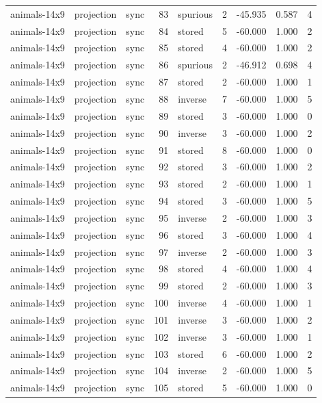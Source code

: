 \begin{tabular}{lllrlrrrr}
animals-14x9 & projection & sync & 83 & spurious & 2 & -45.935 & 0.587 & 4 \\
animals-14x9 & projection & sync & 84 & stored & 5 & -60.000 & 1.000 & 2 \\
animals-14x9 & projection & sync & 85 & stored & 4 & -60.000 & 1.000 & 2 \\
animals-14x9 & projection & sync & 86 & spurious & 2 & -46.912 & 0.698 & 4 \\
animals-14x9 & projection & sync & 87 & stored & 2 & -60.000 & 1.000 & 1 \\
animals-14x9 & projection & sync & 88 & inverse & 7 & -60.000 & 1.000 & 5 \\
animals-14x9 & projection & sync & 89 & stored & 3 & -60.000 & 1.000 & 0 \\
animals-14x9 & projection & sync & 90 & inverse & 3 & -60.000 & 1.000 & 2 \\
animals-14x9 & projection & sync & 91 & stored & 8 & -60.000 & 1.000 & 0 \\
animals-14x9 & projection & sync & 92 & stored & 3 & -60.000 & 1.000 & 2 \\
animals-14x9 & projection & sync & 93 & stored & 2 & -60.000 & 1.000 & 1 \\
animals-14x9 & projection & sync & 94 & stored & 3 & -60.000 & 1.000 & 5 \\
animals-14x9 & projection & sync & 95 & inverse & 2 & -60.000 & 1.000 & 3 \\
animals-14x9 & projection & sync & 96 & stored & 3 & -60.000 & 1.000 & 4 \\
animals-14x9 & projection & sync & 97 & inverse & 2 & -60.000 & 1.000 & 3 \\
animals-14x9 & projection & sync & 98 & stored & 4 & -60.000 & 1.000 & 4 \\
animals-14x9 & projection & sync & 99 & stored & 2 & -60.000 & 1.000 & 3 \\
animals-14x9 & projection & sync & 100 & inverse & 4 & -60.000 & 1.000 & 1 \\
animals-14x9 & projection & sync & 101 & inverse & 3 & -60.000 & 1.000 & 2 \\
animals-14x9 & projection & sync & 102 & inverse & 3 & -60.000 & 1.000 & 1 \\
animals-14x9 & projection & sync & 103 & stored & 6 & -60.000 & 1.000 & 2 \\
animals-14x9 & projection & sync & 104 & inverse & 2 & -60.000 & 1.000 & 5 \\
animals-14x9 & projection & sync & 105 & stored & 5 & -60.000 & 1.000 & 0 \\

\end{tabular}
